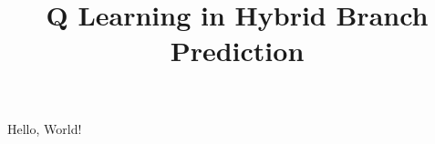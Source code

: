 \documentclass{article}
\title{Q Learning in Hybrid Branch Prediction}
\begin{document}
	Hello, World!
\end{document}

